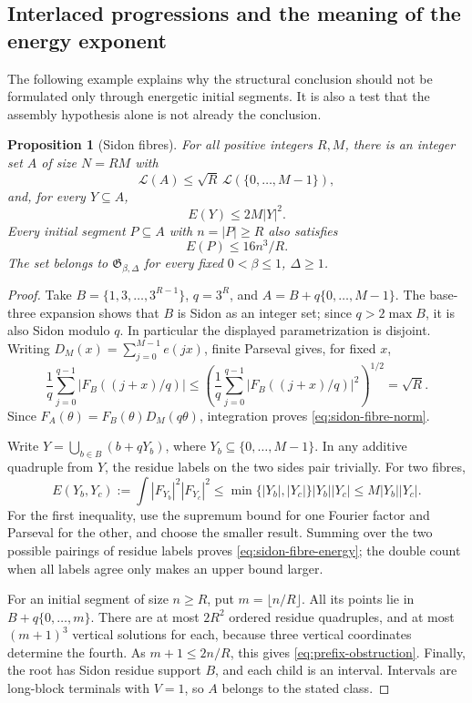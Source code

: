 \documentclass[11pt,reqno]{amsart}
\numberwithin{equation}{section}
\newtheorem{proposition}[theorem]{Proposition}
\theoremstyle{definition}
\theoremstyle{remark}
\newcommand{\La}{\mathcal L}
\begin{document}
\subsection{Interlaced progressions and the meaning of the energy exponent}

The following example explains why the structural conclusion should
not be formulated only through energetic initial segments. It is also
a test that the assembly hypothesis alone is not already the conclusion.

\begin{proposition}[Sidon fibres]\label{prop:sidon-fibres}
For all positive integers $R,M$, there is an integer set $A$ of size
$N=RM$ with
\begin{equation}\label{eq:sidon-fibre-norm}
 \La(A)\le\sqrt R\,\La(\{0,\ldots,M-1\}),
\end{equation}
and, for every $Y\subseteq A$,
\begin{equation}\label{eq:sidon-fibre-energy}
 E(Y)\le2M|Y|^2.
\end{equation}
Every initial segment $P\subseteq A$ with $n=|P|\ge R$ also satisfies
\begin{equation}\label{eq:prefix-obstruction}
 E(P)\le16n^3/R.
\end{equation}
The set belongs to $\mathfrak G_{\beta,\Delta}$ for every fixed
$0<\beta\le1$, $\Delta\ge1$.
\end{proposition}
\begin{proof}
Take $B=\{1,3,\ldots,3^{R-1}\}$, $q=3^R$, and
$A=B+q\{0,\ldots,M-1\}$. The base-three expansion shows that $B$
is Sidon as an integer set; since $q>2\max B$, it is also Sidon
modulo $q$. In particular the displayed parametrization is disjoint.
Writing $D_M(x)=\sum_{j=0}^{M-1}e(jx)$, finite Parseval gives, for
fixed $x$,
\[
 \frac1q\sum_{j=0}^{q-1}|F_B((j+x)/q)|
 \le\left(\frac1q\sum_{j=0}^{q-1}|F_B((j+x)/q)|^2\right)^{1/2}
 =\sqrt R.
\]
Since $F_A(\theta)=F_B(\theta)D_M(q\theta)$, integration proves
\eqref{eq:sidon-fibre-norm}.

Write $Y=\bigcup_{b\in B}(b+qY_b)$, where
$Y_b\subseteq\{0,\ldots,M-1\}$. In any additive quadruple from $Y$,
the residue labels on the two sides pair trivially. For two fibres,
\[
 E(Y_b,Y_c):=\int|F_{Y_b}|^2|F_{Y_c}|^2
 \le\min\{|Y_b|,|Y_c|\}|Y_b||Y_c|
 \le M|Y_b||Y_c|.
\]
For the first inequality, use the supremum bound for one Fourier
factor and Parseval for the other, and choose the smaller result.
Summing over the two possible pairings of residue labels proves
\eqref{eq:sidon-fibre-energy}; the double count when all labels agree
only makes an upper bound larger.

For an initial segment of size $n\ge R$, put $m=\lfloor n/R\rfloor$.
All its points lie in $B+q\{0,\ldots,m\}$. There are at most $2R^2$
ordered residue quadruples, and at most $(m+1)^3$ vertical solutions
for each, because three vertical coordinates determine the fourth.
As $m+1\le2n/R$, this gives \eqref{eq:prefix-obstruction}.
Finally, the root has Sidon residue support $B$, and each child is an
interval. Intervals are long-block terminals with $V=1$, so $A$ belongs
to the stated class.
\end{proof}
\end{document}
